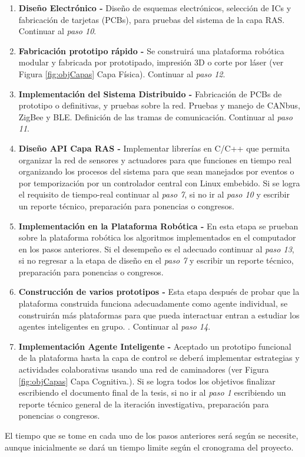 {\begin{enumerate}
  \item \textbf{Dise\~no Electr\'onico - } Dise\~no de esquemas electrónicos, selección de ICs y fabricaci\'on de tarjetas (PCBs), para pruebas del sistema de la capa RAS. Continuar al \emph{paso 10}.\par
  \item \textbf{Fabricaci\'on prototipo r\'apido - } Se construir\'a una plataforma rob\'otica modular y fabricada por prototipado, impresión 3D o corte por láser (ver Figura \ref{fig:objCapas} Capa Física). Continuar al \emph{paso 12}.\par
  \item \textbf{Implementaci\'on del Sistema Distribuido - } Fabricaci\'on de PCBs de prototipo o definitivas, y pruebas sobre la red. Pruebas y manejo de CANbus, ZigBee y BLE. Definición de las tramas de comunicaci\'on. Continuar al \emph{paso 11}.\par
  \item \textbf{Dise\~no API Capa RAS - } Implementar librerías en C/C++ que permita organizar la red de sensores y actuadores para que funciones en tiempo real organizando los procesos del sistema para que sean manejados por eventos o por temporizaci\'on por un controlador central con Linux embebido. Si se logra el requisito de tiempo-real continuar al \emph{paso 7}, si no ir al \emph{paso 10} y escribir un reporte t\'ecnico, preparaci\'on para ponencias o congresos.\par
  \item \textbf{Implementación en la Plataforma Rob\'otica - } En esta etapa se prueban sobre la plataforma rob\'otica los algoritmos implementados en el computador en los pasos anteriores. Si el desempe\~no es el adecuado continuar al \emph{paso 13}, si no regresar a la etapa de dise\~no en el \emph{paso 7} y escribir un reporte t\'ecnico, preparaci\'on para ponencias o congresos.\par
  \item \textbf{Construcción de varios prototipos - } Esta etapa despu\'es de probar que la plataforma construida funciona adecuadamente como agente individual, se construir\'an m\'as plataformas para que pueda interactuar entran a estudiar los agentes inteligentes en grupo. . Continuar al \emph{paso 14}.\par
  \item \textbf{Implementaci\'on Agente Inteligente - } Aceptado un prototipo funcional de la plataforma hasta la capa de control se deberá  implementar estrategias y actividades colaborativas usando una red de caminadores  (ver Figura \ref{fig:objCapas} Capa Cognitiva.). Si se logra todos los objetivos finalizar escribiendo el documento final de la tesis, si no ir al \emph{paso 1} escribiendo un reporte t\'ecnico general de la iteraci\'on investigativa, preparaci\'on para ponencias o congresos.\par
  \end{enumerate}
  El tiempo que se tome en cada uno de los pasos anteriores ser\'a seg\'un se necesite, aunque inicialmente se dar\'a un tiempo limite seg\'un el cronograma del proyecto.\par
}
